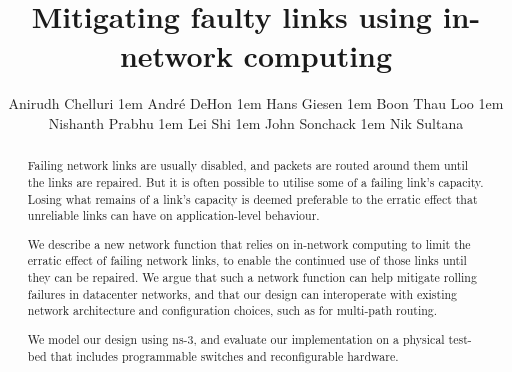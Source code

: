\documentclass[sigconf]{acmart}
\begin{document}
\title{Mitigating faulty links using in-network computing}

\author{Anirudh Chelluri \kern1em
 Andr\'e DeHon \kern1em
 Hans Giesen \kern1em
 Boon Thau Loo \kern1em
 Nishanth Prabhu \kern1em
 Lei Shi \kern1em
 John Sonchack \kern1em
 Nik Sultana}

%
%
%
%


\renewcommand{\shortauthors}{A. Chelluri et al.}

\begin{abstract}
Failing network links are usually disabled, and packets are routed around them
until the links are repaired.  But it is often possible
to utilise some of a failing link's capacity. Losing what remains of a link's
capacity is deemed preferable to the erratic effect that unreliable links can
have on application-level behaviour.

We describe a new network function that relies on in-network computing to limit
the erratic effect of failing network links, to enable the continued use of
those links until they can be repaired. We argue that such a network function
can help mitigate rolling failures in datacenter networks, and that our design
can interoperate with existing network architecture and configuration choices,
such as for multi-path routing.

We model our design using ns-3, and evaluate our implementation on a physical
test-bed that includes programmable switches and reconfigurable hardware.
\end{abstract}
\end{document}
